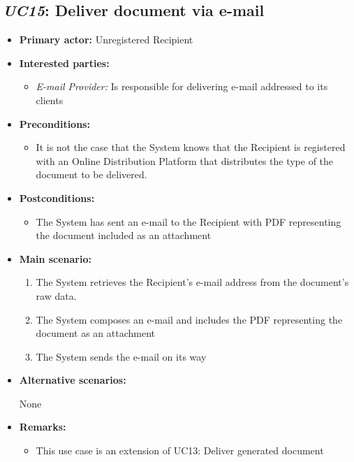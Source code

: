 \documentclass[a4paper,10pt]{article}
\begin{document}
\subsection{\emph{UC15}: Deliver document via e-mail}
\begin{itemize}
    \item \textbf{Primary actor:} Unregistered Recipient
    \item \textbf{Interested parties:} 
        \begin{itemize}
            \item \textit{E-mail Provider:} Is responsible for delivering e-mail addressed to its clients
        \end{itemize}

    \item \textbf{Preconditions:}
        \begin{itemize}
            \item It is not the case that the System knows that the Recipient is registered with an Online Distribution Platform that distributes the type of the document to be delivered.
        \end{itemize}

    \item \textbf{Postconditions:}
        \begin{itemize}
            \item The System has sent an e-mail to the Recipient with PDF representing the document included as an attachment
        \end{itemize}
        
    \item \textbf{Main scenario:} 
    \begin{enumerate}
       \item The System retrieves the Recipient's e-mail address from the document's raw data.
       \item The System composes an e-mail and includes the PDF representing the document as an attachment
       \item The System sends the e-mail on its way
    \end{enumerate}

    \item \textbf{Alternative scenarios:} 
    \begin{enumerate}
        None
    \end{enumerate}
    
    \item \textbf{Remarks:}
        \begin{itemize}
            \item This use case is an extension of UC13: Deliver generated document
        \end{itemize}
\end{itemize}
\end{document}
